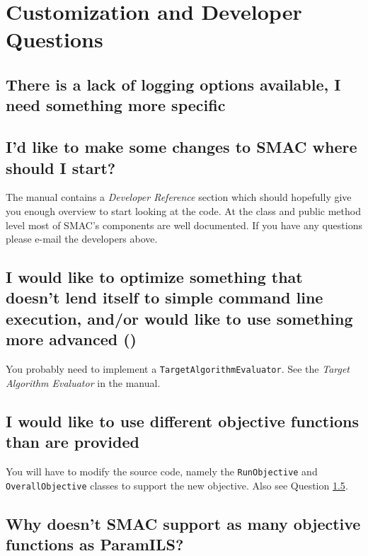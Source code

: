 \documentclass[11pt,letterpaper,oneside]{article}
\begin{document}
	
\section{Customization and Developer Questions}

\subsection{There is a lack of logging options available, I need something more specific}
\label{sec:alternative-logging}
	

	
	
\subsection{I'd like to make some changes to SMAC where should I start?}

	The manual contains a \emph{Developer Reference} section which should hopefully give you enough overview to start looking at the code. At the class and public method level most of SMAC's components are well documented. If you have any questions please e-mail the developers above.

\subsection{I would like to optimize something that doesn't lend itself to simple command line execution, and/or would like to use something more advanced ()}

	You probably need to implement a \texttt{TargetAlgorithmEvaluator}. See the \emph{Target Algorithm Evaluator} in the manual.

\subsection{I would like to use different objective functions than are provided}

	You will have to modify the source code, namely the \texttt{RunObjective} and \texttt{OverallObjective} classes to support the new objective. Also see Question \ref{sec:rf-objectives}.

\subsection{Why doesn't SMAC support as many objective functions as ParamILS?}
\label{sec:rf-objectives}
\end{document}
